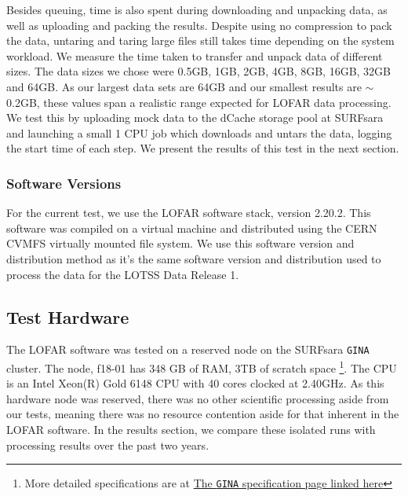 Besides queuing, time is also spent during downloading and unpacking data, as well as uploading and packing the results. Despite using no compression to pack the data, untaring and taring large files still takes time depending on the system workload. We measure the time taken to transfer and unpack data of different sizes. The data sizes we chose were 0.5GB, 1GB, 2GB, 4GB, 8GB, 16GB, 32GB and 64GB. As our largest data sets are 64GB and our smallest results are $\sim$0.2GB, these values span a realistic range expected for LOFAR data processing. We test this by uploading mock data to the dCache storage pool at SURFsara and launching a small 1 CPU job which downloads and untars the data, logging the start time of each step. We present the results of this test in the next section. 


\subsubsection{Software Versions}\label{sec:software_versions}
For the current test, we use the LOFAR software stack, version 2.20.2. This software was compiled on a virtual machine and distributed using the CERN CVMFS virtually mounted file system. We use this software version and distribution method as it's the same software version and distribution used to process the data for the LOTSS Data Release 1. 

\subsection{Test Hardware}\label{sec:hardware}

The LOFAR software was tested on a reserved node on the SURFsara \texttt{GINA} cluster. The node, f18-01 has 348 GB of RAM, 3TB of scratch space \footnote{More detailed specifications are at \href{http://docs.surfsaralabs.nl/projects/grid/en/latest/Pages/Service/system_specifications/gina_specs.html}{The \texttt{GINA} specification page linked here}}. The CPU is an Intel Xeon(R) Gold 6148 CPU with 40 cores clocked at 2.40GHz.  As this hardware node was reserved, there was no other scientific processing aside from our tests, meaning there was no resource contention aside for that inherent in the LOFAR software. In the results section, we compare these isolated runs with processing results over the past two years. 